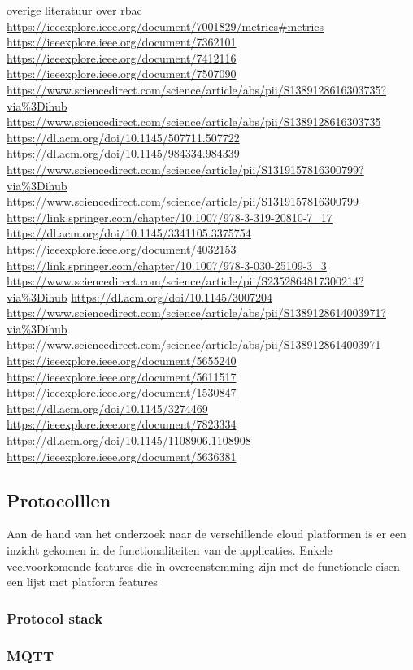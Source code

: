 overige literatuur over rbac
\url{https://ieeexplore.ieee.org/document/7001829/metrics#metrics}
\url{https://ieeexplore.ieee.org/document/7362101}
\url{https://ieeexplore.ieee.org/document/7412116}
\url{https://ieeexplore.ieee.org/document/7507090}
\url{https://www.sciencedirect.com/science/article/abs/pii/S1389128616303735?via%3Dihub}
\url{https://www.sciencedirect.com/science/article/abs/pii/S1389128616303735}
\url{https://dl.acm.org/doi/10.1145/507711.507722}
\url{https://dl.acm.org/doi/10.1145/984334.984339}
\url{https://www.sciencedirect.com/science/article/pii/S1319157816300799?via%3Dihub}
\url{https://www.sciencedirect.com/science/article/pii/S1319157816300799}
\url{https://link.springer.com/chapter/10.1007/978-3-319-20810-7_17}
\url{https://dl.acm.org/doi/10.1145/3341105.3375754}
\url{https://ieeexplore.ieee.org/document/4032153}
\url{https://link.springer.com/chapter/10.1007/978-3-030-25109-3_3}
\url{https://www.sciencedirect.com/science/article/pii/S2352864817300214?via%3Dihub}
\url{https://dl.acm.org/doi/10.1145/3007204}
\url{https://www.sciencedirect.com/science/article/abs/pii/S1389128614003971?via%3Dihub}
\url{https://www.sciencedirect.com/science/article/abs/pii/S1389128614003971}
\url{https://ieeexplore.ieee.org/document/5655240}
\url{https://ieeexplore.ieee.org/document/5611517}
\url{https://ieeexplore.ieee.org/document/1530847}
\url{https://dl.acm.org/doi/10.1145/3274469}
\url{https://ieeexplore.ieee.org/document/7823334}
\url{https://dl.acm.org/doi/10.1145/1108906.1108908}
\url{https://ieeexplore.ieee.org/document/5636381}
\subsection{Protocolllen}
Aan de hand van het onderzoek naar de verschillende cloud platformen is er een inzicht gekomen in de functionaliteiten van de applicaties. Enkele veelvoorkomende features die in overeenstemming zijn met de functionele eisen een lijst met platform features

\subsubsection{Protocol stack}
\begin{center}
\end{center}


\subsubsection{MQTT}

